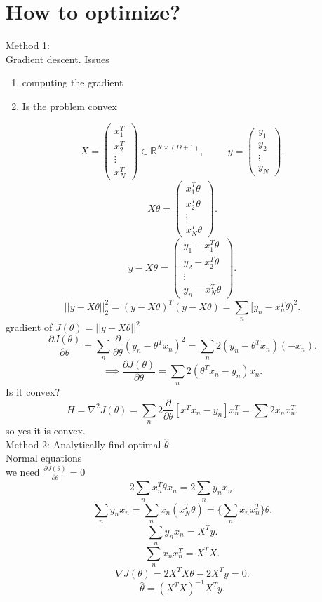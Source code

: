 \documentclass[a4paper,12pt]{scrartcl} %
\theoremstyle{darktheorem}
\begin{document}
\section{How to optimize?}
Method 1:\\
Gradient descent. Issues
\begin{enumerate}
    \item computing the gradient
    \item Is the problem convex
\end{enumerate}
\[
    X = \begin{pmatrix} x_1^{T} \\ x_2^{T} \\ \vdots \\ x_N^{T} \end{pmatrix}  \in \mathbb{R}^{N \times (D+1)}, \hspace{1cm} y = \begin{pmatrix} y_1 \\ y_2 \\ \vdots \\ y_N \end{pmatrix} 
.\] 
\[
X\theta = \begin{pmatrix} x_1^{T}\theta \\ x_2^{T}\theta \\ \vdots \\ x^{T}_N\theta \end{pmatrix} 
.\] 
\[
y-X\theta = \begin{pmatrix} y_1 - x_1^{T}\theta \\ y_2 - x_2^{T}\theta \\ \vdots \\ y_n - x_N^{T}\theta \end{pmatrix} 
.\] 
\[
||y - X\theta||^{2}_2 = (y-X\theta)^{T}(y-X\theta) = \sum_{n}^{}[y_n-x_n^{T}\theta)^2
.\] 
gradient of $J(\theta) = ||y-X\theta||^2$
\[
    \frac{\partial J(\theta)}{\partial \theta} = \sum_{n}^{} \frac{\partial}{\partial \theta}(y_n-\theta^{T}x_n)^2 = \sum_{n}^{}2(y_n - \theta^{T}x_n)(-x_n)
.\] 
\[
\implies \frac{\partial J(\theta)}{\partial \theta} = \sum_{n}^{}2(\theta^{T}x_n - y_n)x_n
.\] 
Is it convex?
\[
    H = \nabla^2J(\theta) = \sum_{n}^{}2\frac{\partial}{\partial\theta}[x^{T}x_n-y_n]x^{T}_n = \sum_{}^{}2x_nx_n^{T}
.\] 
so yes it is convex.
\\

Method 2: Analytically
find optimal  $\hat \theta$.\\
Normal equations\\
we need $\frac{\partial J(\theta)}{\partial \theta} = 0$ 
\[
2\sum_{n}^{}x_n^{T}\theta x_n = 2 \sum_{n}^{}y_nx_n
.\] 
\[
    \sum_{n}^{}y_nx_n = \sum_{n}^{}x_n(x_N^{T}\theta) = \{\sum_{n}^{}x_nx_n^{T}\}\theta
.\] 
\[
\sum_{n}^{}y_nx_n = X^{T}y
.\] 
\[
\sum_{n}^{}x_nx_n^{T} = X^{T}X
.\] 
\[
\nabla J(\theta) = 2 X^{T}X \theta - 2X^{T}y = 0
.\] 
\[
\hat \theta = (X^{T}X)^{-1}X^{T}y
.\] 
\end{document}

